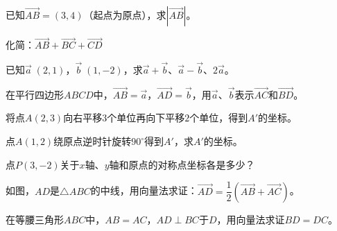 \documentclass[a4paper,12pt]{ctexart}
\begin{document}



\begin{exercise}
\item 已知$\overrightarrow{AB}=(3,4)$（起点为原点），求$|\overrightarrow{AB}|$。
\item 化简：$\overrightarrow{AB}+\overrightarrow{BC}+\overrightarrow{CD}$
\item 已知$\vec a\;(2,1)$，$\vec b\;(1,-2)$，求$\vec a+\vec b$、$\vec a-\vec b$、$2\vec a$。
\item 在平行四边形$ABCD$中，$\overrightarrow{AB}=\vec a$，$\overrightarrow{AD}=\vec b$，用$\vec a$、$\vec b$表示$\overrightarrow{AC}$和$\overrightarrow{BD}$。
\end{exercise}

\newpage











\begin{exercise}
\item 将点$A(2,3)$向右平移$3$个单位再向下平移$2$个单位，得到$A'$的坐标。
\item 点$A(1,2)$绕原点逆时针旋转$90^\circ$得到$A'$，求$A'$的坐标。
\item 点$P(3,-2)$关于$x$轴、$y$轴和原点的对称点坐标各是多少？
\item 如图，$AD$是$\triangle ABC$的中线，用向量法求证：$\overrightarrow{AD}=\dfrac12(\overrightarrow{AB}+\overrightarrow{AC})$。
\item 在等腰三角形$ABC$中，$AB=AC$，$AD\perp BC$于$D$，用向量法求证$BD=DC$。
\end{exercise}
\end{document}
